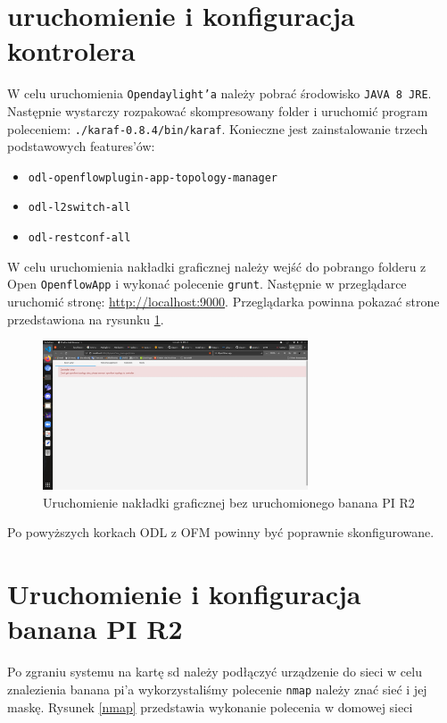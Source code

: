 \documentclass[12pt,a4paper,twoside]{article}
\begin{document}
\section{uruchomienie i konfiguracja kontrolera}
W celu uruchomienia \texttt{Opendaylight'a} należy pobrać środowisko \texttt{JAVA 8 JRE}.
Następnie wystarczy rozpakować skompresowany folder i uruchomić program poleceniem: \texttt{./karaf-0.8.4/bin/karaf}.
Konieczne jest zainstalowanie trzech podstawowych features'ów: 
\begin{itemize}
	\item\texttt{odl-openflowplugin-app-topology-manager}  
	\item\texttt{odl-l2switch-all}
	\item\texttt{odl-restconf-all}
\end{itemize}
W celu uruchomienia nakładki graficznej należy wejść do pobrango folderu z Open \texttt{OpenflowApp} i wykonać polecenie \texttt{grunt}. Następnie w przeglądarce uruchomić stronę:
 \url{http://localhost:9000}. Przeglądarka  powinna pokazać strone przedstawiona na rysunku \ref{OFM}.
 \begin{figure}[!h]
 	\centering\includegraphics[width=0.7\textwidth]{OFM_uruchomienie.jpg}
 	\caption{Uruchomienie nakładki graficznej bez uruchomionego banana PI R2} \label{OFM}
 \end{figure}
\newline Po powyższych korkach ODL z OFM powinny być poprawnie skonfigurowane.


\section{Uruchomienie i konfiguracja banana PI R2}
Po zgraniu systemu na kartę sd należy podłączyć urządzenie do sieci w celu znalezienia banana pi'a wykorzystaliśmy 
polecenie \texttt{nmap} należy znać sieć i jej maskę. Rysunek \ref{nmap} przedstawia wykonanie polecenia w domowej sieci 
\end{document}

